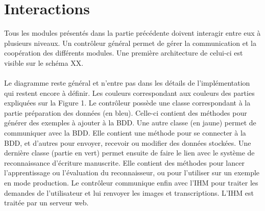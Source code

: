 \section{Interactions}

Tous les modules présentés dans la partie précédente doivent interagir entre
eux à plusieurs niveaux. Un contrôleur général permet de gérer la communication
et la coopération des différents modules. Une première architecture de celui-ci
est visible sur le schéma XX.

\paragraph{}
\begin{mdframed}[frametitle={Titre}, innerbottommargin=10]
\begin{center}
\end{center}
\end{mdframed}

\paragraph{}
Le diagramme reste général et n’entre pas dans les détails de l’implémentation
qui restent encore à définir. Les couleurs correspondant aux couleurs des
parties expliquées sur la Figure 1. Le contrôleur possède une classe
correspondant à la partie préparation des données (en bleu). Celle-ci contient
des méthodes pour générer des exemples à ajouter à la BDD. Une autre classe
(en jaune) permet de communiquer avec la BDD. Elle contient une méthode pour se
connecter à la BDD, et d’autres pour envoyer, recevoir ou modifier des données
stockées. Une dernière classe (partie en vert) permet ensuite de faire le lien
avec le système de reconnaissance d’écriture manuscrite. Elle contient des
méthodes pour lancer l’apprentissage ou l’évaluation du reconnaisseur, ou pour
l’utiliser sur un exemple en mode production. Le contrôleur communique enfin
avec l’IHM pour traiter les demandes de l’utilisateur et lui renvoyer les
images et transcriptions. L’IHM est traitée par un serveur web.